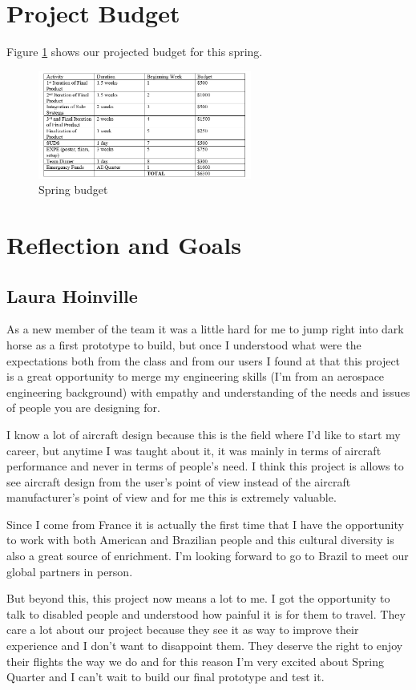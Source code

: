 \section{Project Budget}
Figure \ref{fig:budget} shows our projected budget for this spring.

\begin{figure}[h]
\centering
\includegraphics[width=7cm]{images/budget.png}
\caption{Spring budget}
\label{fig:budget}
\end{figure}


\section{Reflection and Goals}

\subsection{Laura Hoinville}
As a new member of the team it was a little hard for me to jump right into dark horse as a first prototype to build, but once I understood what were the expectations both from the class and from our users I found at that this project is a great opportunity to merge my engineering skills (I'm from an aerospace engineering background) with empathy and understanding of the needs and issues of people you are designing for. 

I know a lot of aircraft design because this is the field where I’d like to start my career, but anytime I was taught about it, it was mainly in terms of aircraft performance and never in terms of people’s need. I think this project is allows to see aircraft design from the user’s point of view instead of the aircraft manufacturer’s point of view and for me this is extremely valuable. 

Since I come from France it is actually the first time that I have the opportunity to work with both American and Brazilian people and this cultural diversity is also a great source of enrichment. I’m looking forward to go to Brazil to meet our global partners in person. 

But beyond this, this project now means a lot to me. I got the opportunity to talk to disabled people and understood how painful it is for them to travel. They care a lot about our project because they see it as way to improve their experience and I don’t want to disappoint them. They deserve the right to enjoy their flights the way we do and for this reason I’m very excited about Spring Quarter and I can’t wait to build our final prototype and test it.

